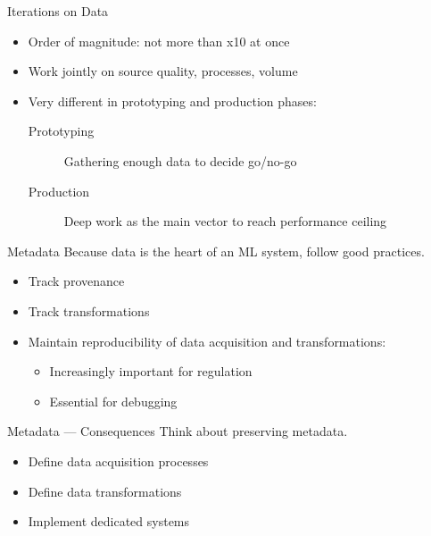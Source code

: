 \begin{frame}{Iterations on Data}
  \begin{itemize}
    \item Order of magnitude: not more than x10 at once
    \item Work jointly on source quality, processes, volume
    \item Very different in prototyping and production phases:\\[5mm]
      \begin{description}
        \item[Prototyping] Gathering enough data to decide go/no-go
        \item[Production] Deep work as the main vector to reach performance ceiling
      \end{description}
  \end{itemize}

  \hugo
\end{frame}


\begin{frame}{Metadata}
  Because data is the heart of an ML system, follow good practices.

  \begin{itemize}
    \item Track provenance
    \item Track transformations
    \item Maintain reproducibility of data acquisition and transformations:\\[2mm]
      \begin{itemize}
        \item Increasingly important for regulation
        \item Essential for debugging
      \end{itemize}
  \end{itemize}

  \hugo
\end{frame}


\begin{frame}{Metadata — Consequences}
  Think about preserving metadata.

  \begin{itemize}
    \item Define data acquisition processes
    \item Define data transformations
    \item Implement dedicated systems
  \end{itemize}


  \hugo
\end{frame}


